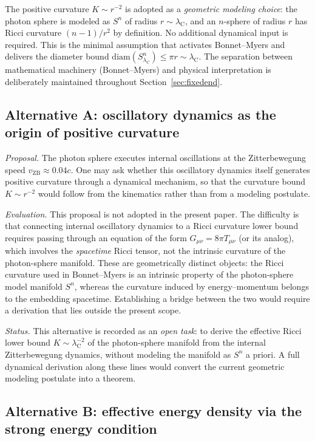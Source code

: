 \documentclass[%
 reprint, amsmath,amssymb, aps, prb, ]{revtex4-2}
\numberwithin{equation}{section}
\newcommand{\lambdaC}{\lambda_{\mathrm{C}}}
\begin{document}
The positive curvature $K \sim r^{-2}$ is adopted as a \emph{geometric modeling choice}: the photon sphere is modeled as $S^n$ of radius $r \sim \lambdaC$, and an $n$-sphere of radius $r$ has Ricci curvature $(n-1)/r^2$ by definition. No additional dynamical input is required. This is the minimal assumption that activates Bonnet--Myers and delivers the diameter bound $\mathrm{diam}(S^n_{\lambdaC}) \leq \pi r \sim \lambdaC$. The separation between mathematical machinery (Bonnet--Myers) and physical interpretation is deliberately maintained throughout Section~\ref{sec:fixedend}.

\subsection{Alternative A: oscillatory dynamics as the origin of positive curvature}

\textit{Proposal.} The photon sphere executes internal oscillations at the Zitterbewegung speed $v_\mathrm{ZB} \approx 0.04c$. One may ask whether this oscillatory dynamics itself generates positive curvature through a dynamical mechanism, so that the curvature bound $K \sim r^{-2}$ would follow from the kinematics rather than from a modeling postulate.

\textit{Evaluation.} This proposal is not adopted in the present paper. The difficulty is that connecting internal oscillatory dynamics to a Ricci curvature lower bound requires passing through an equation of the form $G_{\mu\nu} = 8\pi T_{\mu\nu}$ (or its analog), which involves the \emph{spacetime} Ricci tensor, not the intrinsic curvature of the photon-sphere manifold. These are geometrically distinct objects: the Ricci curvature used in Bonnet--Myers is an intrinsic property of the photon-sphere model manifold $S^n$, whereas the curvature induced by energy--momentum belongs to the embedding spacetime. Establishing a bridge between the two would require a derivation that lies outside the present scope.

\textit{Status.} This alternative is recorded as an \emph{open task}: to derive the effective Ricci lower bound $K \sim \lambdaC^{-2}$ of the photon-sphere manifold from the internal Zitterbewegung dynamics, without modeling the manifold as $S^n$ a priori. A full dynamical derivation along these lines would convert the current geometric modeling postulate into a theorem.

\subsection{Alternative B: effective energy density via the strong energy condition}
\end{document}
